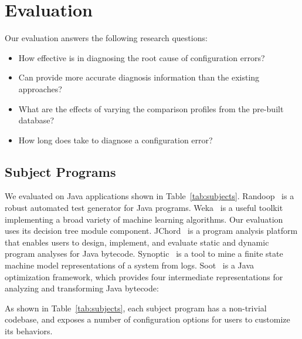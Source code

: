 \section{Evaluation}
\label{sec:evaluation}


Our evaluation answers the following research questions:

\begin{itemize}
\item How effective is \ourtool in diagnosing the root cause of
configuration errors?
\item Can \ourtool provide more accurate diagnosis information than
the existing approaches? 
\item What are the effects of varying the comparison profiles from
the pre-built database?
\item How long does \ourtool take to diagnose a configuration error?
\end{itemize}


\subsection{Subject Programs}

We evaluated \ourtool on \subjectnum Java applications shown
in Table~\ref{tab:subjects}.
Randoop~\cite{randoop} is a robust automated test generator
for Java programs. Weka~\cite{weka} is a useful toolkit implementing
a broad variety of machine learning algorithms. Our evaluation
uses its decision tree module component. JChord~\cite{jchord}
is a program analysis platform that enables users to design, implement,
and evaluate static and dynamic program analyses for Java bytecode.
Synoptic~\cite{synoptic} is a tool to mine a finite state machine
model representations of a system from logs.
Soot~\cite{soot} is a Java optimization framework, which provides four
intermediate representations for analyzing and transforming Java bytecode:

As shown in Table~\ref{tab:subjects}, each subject program has a non-trivial
codebase, and exposes a number of configuration options for users
to customize its behaviors.

